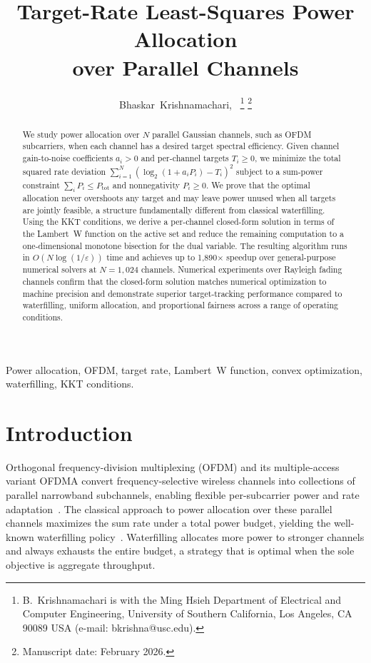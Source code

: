 \documentclass[journal]{IEEEtran}
\title{Target-Rate Least-Squares Power Allocation\\over Parallel Channels}
\author{Bhaskar~Krishnamachari,~\IEEEmembership{Fellow,~IEEE}
\thanks{B.~Krishnamachari is with the Ming Hsieh Department of Electrical and Computer Engineering, University of Southern California, Los Angeles, CA 90089 USA (e-mail: bkrishna@usc.edu).}
\thanks{Manuscript date: February 2026.}}
\begin{document}
\maketitle

\begin{abstract}
We study power allocation over $N$ parallel Gaussian channels, such as OFDM subcarriers, when each channel has a desired target spectral efficiency.
Given channel gain-to-noise coefficients $a_i>0$ and per-channel targets $T_i\ge 0$, we minimize the total squared rate deviation $\sum_{i=1}^{N}(\log_2(1+a_iP_i)-T_i)^2$ subject to a sum-power constraint $\sum_i P_i \le P_{\mathrm{tot}}$ and nonnegativity $P_i \ge 0$.
We prove that the optimal allocation never overshoots any target and may leave power unused when all targets are jointly feasible, a structure fundamentally different from classical waterfilling.
Using the KKT conditions, we derive a per-channel closed-form solution in terms of the Lambert~W function on the active set and reduce the remaining computation to a one-dimensional monotone bisection for the dual variable.
The resulting algorithm runs in $O(N\log(1/\varepsilon))$ time and achieves up to 1{,}890$\times$ speedup over general-purpose numerical solvers at $N=1{,}024$ channels.
Numerical experiments over Rayleigh fading channels confirm that the closed-form solution matches numerical optimization to machine precision and demonstrate superior target-tracking performance compared to waterfilling, uniform allocation, and proportional fairness across a range of operating conditions.
\end{abstract}

\begin{IEEEkeywords}
Power allocation, OFDM, target rate, Lambert~W function, convex optimization, waterfilling, KKT conditions.
\end{IEEEkeywords}

\section{Introduction}
\label{sec:intro}

Orthogonal frequency-division multiplexing (OFDM) and its multiple-access variant OFDMA convert frequency-selective wireless channels into collections of parallel narrowband subchannels, enabling flexible per-subcarrier power and rate adaptation~\cite{tse2005fundamentals,goldsmithvaraiya1997}.
The classical approach to power allocation over these parallel channels maximizes the sum rate under a total power budget, yielding the well-known waterfilling policy~\cite{coverandthomas2006,tse2005fundamentals}.
Waterfilling allocates more power to stronger channels and always exhausts the entire budget, a strategy that is optimal when the sole objective is aggregate throughput.
\end{document}
